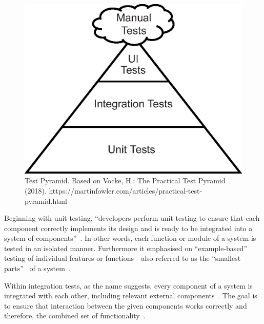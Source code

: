 \documentclass[runningheads]{llncs}
\begin{document}
\begin{figure}
  \centering
  \includegraphics[width=.618\textwidth]{includes/test_pyramid.eps}
  \caption{Test Pyramid. Based on Vocke, H.: The Practical Test Pyramid (2018). https://martinfowler.com/articles/practical-test-pyramid.html}
  \label{fig:test_pyramid}
\end{figure}

Beginning with unit testing, ``developers perform unit testing to ensure that each component correctly implements its design and is ready to be integrated into a system of components''~\cite{Hartmann2000}. In other words, each function or module of a system is tested in an isolated manner. Furthermore it emphasised on ``example-based''~\cite{Corgozinho2023} testing of individual features or functions---also referred to as the ``smallest parts''~\cite{Aniche2022} of a system~\cite{Hartmann2000,Corgozinho2023}.

Within integration tests, as the name suggests, every component of a system is integrated with each other, including relevant external components~\cite{Aniche2022,Hartmann2000,Radziwill2020}. The goal is to ensure that interaction between the given components works correctly and therefore, the combined set of functionality~\cite{Hartmann2000,Aniche2022}.
\end{document}
